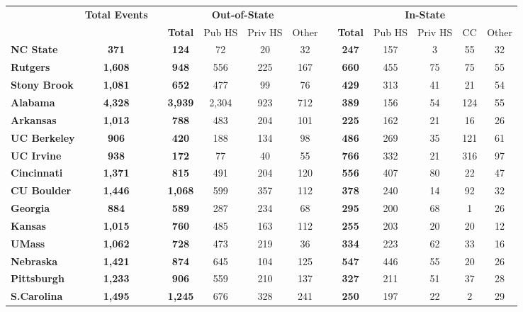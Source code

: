 \begin{tabular*}{\textwidth}{@{\extracolsep{\fill} } lcccccccccccc}%
&\bfseries Total Events&&\multicolumn{4}{c}{\bfseries Out-of-State}&&\multicolumn{5}{c}{\bfseries In-State}\\%
&&&\bfseries Total&Pub HS&Priv HS&Other&&\bfseries Total&Pub HS&Priv HS&CC&Other\\%
\hline%
\bfseries NC State&\bfseries 371&&\bfseries 124&72&20&32&&\bfseries 247&157&3&55&32\\%
\bfseries Rutgers&\bfseries 1,608&&\bfseries 948&556&225&167&&\bfseries 660&455&75&75&55\\%
\bfseries Stony Brook&\bfseries 1,081&&\bfseries 652&477&99&76&&\bfseries 429&313&41&21&54\\%
\bfseries Alabama&\bfseries 4,328&&\bfseries 3,939&2,304&923&712&&\bfseries 389&156&54&124&55\\%
\bfseries Arkansas&\bfseries 1,013&&\bfseries 788&483&204&101&&\bfseries 225&162&21&16&26\\%
\bfseries UC Berkeley&\bfseries 906&&\bfseries 420&188&134&98&&\bfseries 486&269&35&121&61\\%
\bfseries UC Irvine&\bfseries 938&&\bfseries 172&77&40&55&&\bfseries 766&332&21&316&97\\%
\bfseries Cincinnati&\bfseries 1,371&&\bfseries 815&491&204&120&&\bfseries 556&407&80&22&47\\%
\bfseries CU Boulder&\bfseries 1,446&&\bfseries 1,068&599&357&112&&\bfseries 378&240&14&92&32\\%
\bfseries Georgia&\bfseries 884&&\bfseries 589&287&234&68&&\bfseries 295&200&68&1&26\\%
\bfseries Kansas&\bfseries 1,015&&\bfseries 760&485&163&112&&\bfseries 255&203&20&20&12\\%
\bfseries UMass&\bfseries 1,062&&\bfseries 728&473&219&36&&\bfseries 334&223&62&33&16\\%
\bfseries Nebraska&\bfseries 1,421&&\bfseries 874&645&104&125&&\bfseries 547&446&55&20&26\\%
\bfseries Pittsburgh&\bfseries 1,233&&\bfseries 906&559&210&137&&\bfseries 327&211&51&37&28\\%
\bfseries S.Carolina&\bfseries 1,495&&\bfseries 1,245&676&328&241&&\bfseries 250&197&22&2&29\\%
\hline%
\end{tabular*}